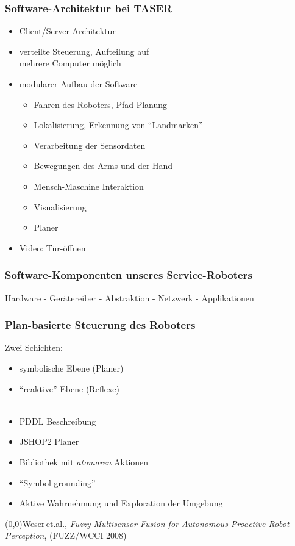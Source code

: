 \documentclass[t]{beamer}
\def\quelle#1{{\tiny \makebox(0,0){}\vfill\hfill #1}}
\begin{document}
\begin{frame}
\frametitle{Software-Architektur bei TASER}
\vspace*{-5mm}
\begin{itemize}
\item Client/Server-Architektur
\item verteilte Steuerung, Aufteilung auf\\
      mehrere Computer möglich
\item modularer Aufbau der Software
      \begin{itemize}
      \item Fahren des Roboters, Pfad-Planung
      \item Lokalisierung, Erkennung von "`Landmarken"'
      \item Verarbeitung der Sensordaten
      \item Bewegungen des Arms und der Hand
      \item Mensch-Maschine Interaktion
      \item Visualisierung
      \item Planer
      \end{itemize}
\item Video: Tür-öffnen
\end{itemize}
\end{frame}


\begin{frame}
\frametitle{Software-Komponenten unseres Service-Roboters}
Hardware - Gerätereiber - Abstraktion - Netzwerk - Applikationen
\end{frame}


\begin{frame}
\frametitle{Plan-basierte Steuerung des Roboters}
Zwei Schichten:
\begin{itemize}
\item symbolische Ebene (Planer)
\item "`reaktive"' Ebene (Reflexe)
      \\~
\item PDDL Beschreibung
\item JSHOP2 Planer
\item Bibliothek mit {\em atomaren} Aktionen
\item "`Symbol grounding"'
\item Aktive Wahrnehmung und Exploration der Umgebung
\end{itemize}
\quelle{Weser\,et.al., 
{\em Fuzzy Multisensor Fusion for Autonomous Proactive Robot Perception}, 
(FUZZ/WCCI 2008)}
\end{frame}
\end{document}
